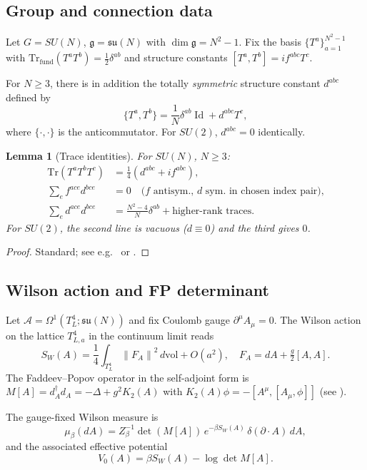 \documentclass[11pt,a4paper]{amsart}
\newtheorem{lemma}[theorem]{Lemma}
\theoremstyle{definition}
\newcommand{\gfrak}{\mathfrak{g}}
\newcommand{\su}{\mathfrak{su}}
\newcommand{\norm}[1]{\left\lVert#1\right\rVert}
\newcommand{\Tr}{\mathrm{Tr}}
\newcommand{\dvol}{\, d\mathrm{vol}}
\DeclareMathOperator{\id}{Id}
\begin{document}
\subsection{Group and connection data}

Let $G = SU(N)$, $\gfrak = \su(N)$ with $\dim \gfrak = N^2-1$. Fix the
basis $\{T^a\}_{a=1}^{N^2-1}$ with $\Tr_{\mathrm{fund}}(T^a T^b) =
\tfrac{1}{2}\delta^{ab}$ and structure constants
$[T^a, T^b] = i f^{abc} T^c$.

For $N \geq 3$, there is in addition the totally \emph{symmetric}
structure constant $d^{abc}$ defined by
\[
\{T^a, T^b\} = \frac{1}{N}\delta^{ab} \id + d^{abc} T^c,
\]
where $\{\cdot,\cdot\}$ is the anticommutator. For $SU(2)$, $d^{abc} = 0$
identically.

\begin{lemma}[Trace identities]\label{lem:trace-id}
For $SU(N)$, $N \geq 3$:
\begin{align*}
\Tr(T^a T^b T^c) &= \tfrac{1}{4}(d^{abc} + i f^{abc}), \\
\sum_e f^{ace} d^{bce} &= 0 \quad (f\text{ antisym., }d\text{ sym. in chosen index pair),}\\
\sum_e d^{ace} d^{bce} &= \tfrac{N^2-4}{N}\delta^{ab} + \text{higher-rank traces}.
\end{align*}
For $SU(2)$, the second line is vacuous ($d \equiv 0$) and the third gives $0$.
\end{lemma}

\begin{proof}
Standard; see e.g.\ \cite[Appendix A]{PeskinSchroeder1995} or
\cite[\S 33.3]{Slansky1981}.
\end{proof}

\subsection{Wilson action and FP determinant}

Let $\mathcal A = \Omega^1(T^4_L; \su(N))$ and fix Coulomb gauge
$\partial^\mu A_\mu = 0$. The Wilson action on the lattice
$T^4_{L,a}$ in the continuum limit reads
\[
S_W(A) = \frac{1}{4} \int_{T^4_L} \norm{F_A}^2 \dvol + O(a^2),
\quad F_A = dA + \tfrac{g}{2}[A, A].
\]
The Faddeev--Popov operator in the self-adjoint form is
$M[A] = d_A^\dagger d_A = -\Delta + g^2 K_2(A)$ with
$K_2(A)\phi = -[A^\mu, [A_\mu, \phi]]$
(see \cite[Lemma~2.2]{RemondiereFPHess_2026}).

The gauge-fixed Wilson measure is
\[
\mu_\beta(dA) = Z_\beta^{-1} \det(M[A]) \, e^{-\beta S_W(A)}
\,\delta(\partial \cdot A)\, dA,
\]
and the associated effective potential
\[
V_0(A) = \beta S_W(A) - \log\det M[A].
\]
\end{document}
